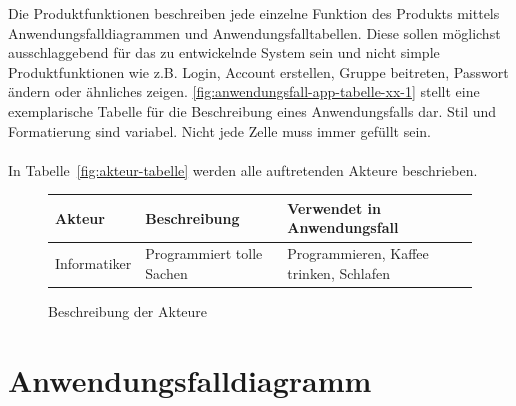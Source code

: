 \begin{tcolorbox}
Die Produktfunktionen beschreiben jede einzelne Funktion des Produkts mittels Anwendungsfalldiagrammen und Anwendungsfalltabellen.
Diese sollen möglichst ausschlaggebend für das zu entwickelnde System sein und nicht simple Produktfunktionen wie z.B. Login, Account erstellen, Gruppe beitreten, Passwort ändern oder ähnliches zeigen.
\autoref{fig:anwendungsfall-app-tabelle-xx-1} stellt eine exemplarische Tabelle für die Beschreibung eines Anwendungsfalls dar. Stil und Formatierung sind variabel. Nicht jede Zelle muss immer gefüllt sein.
\\\\
In  Tabelle~\autoref{fig:akteur-tabelle} werden alle auftretenden Akteure beschrieben.


\end{tcolorbox}

\begin{figure}[h]
	\centering
	
	\begin{tabularx}{\textwidth}{ p{} | p{} | X }
		\textbf{Akteur} & \textbf{Beschreibung} & \textbf{Verwendet in Anwendungsfall} \\ \hline
		Informatiker & Programmiert tolle Sachen & Programmieren, Kaffee trinken, Schlafen
	\end{tabularx}
	
	\caption{Beschreibung der Akteure}
	\label{fig:akteur-tabelle}
\end{figure}



\section{Anwendungsfalldiagramm}

